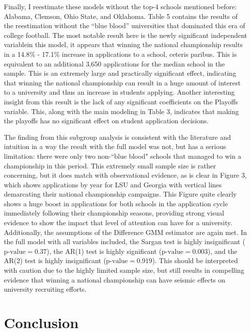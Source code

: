 \documentclass[12pt,english]{article}
\begin{document}
Finally, I reestimate these models without the top-4 schools mentioned before: Alabama, Clemson, Ohio State, and Oklahoma. Table 5 contains the results of the reestimation without the ``blue blood” universities that dominated this era of college football. The most notable result here is the newly significant independent variable\textemdash in this model, it appears that winning the national championship results in a 14.8\% - 17.1\% increase in applications to a school, ceteris paribus. This is equivalent to an additional 3,650 applications for the median school in the sample. This is an extremely large and practically significant effect, indicating that winning the national championship can result in a huge amount of interest to a university and thus an increase in students applying. Another interesting insight from this result is the lack of any significant coefficients on the Playoffs variable. This, along with the main modeling in Table 3, indicates that making the playoffs has no significant effect on student application decisions.

The finding from this subgroup analysis is consistent with the literature and intuition in a way the result with the full model was not, but has a serious limitation: there were only two non-``blue blood" schools that managed to win a championship in this period. This extremely small sample size is rather concerning, but it does match with observational evidence, as is clear in Figure 3, which shows applications by year for LSU and Georgia with vertical lines demarcating their national championship campaigns. This Figure quite clearly shows a huge boost in applications for both schools in the application cycle immediately following their championship seasons, providing strong visual evidence to show the impact that level of attention can have for a university. Additionally, the assumptions of the Difference GMM estimator are again met. In the full model with all variables included, the Sargan test is highly insignificant ($\text{p-value} = 0.37$), the AR(1) test is highly significant ($\text{p-value}=0.003$), and the AR(2) test is highly insignificant ($\text{p-value}=0.919$). This should be interpreted with caution due to the highly limited sample size, but still results in compelling evidence that winning a national championship can have seismic effects on university recruiting efforts. 


\section{Conclusion}
\end{document}
